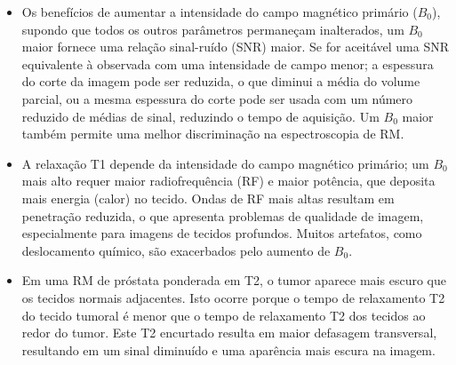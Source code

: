 \documentclass[11pt,a4paper]{article}
\newcounter{exemplo}
\begin{document}
\begin{exemplo}
\begin{itemize}
        \item Os benefícios de aumentar a intensidade do campo magnético primário ($B_0$), supondo que todos os outros parâmetros permaneçam inalterados, um $B_0$ maior fornece uma relação sinal-ruído (SNR) maior. Se for aceitável uma SNR equivalente à observada com uma intensidade de campo menor; a espessura do corte da imagem pode ser reduzida, o que diminui a média do volume parcial, ou a mesma espessura do corte pode ser usada com um número reduzido de médias de sinal, reduzindo o tempo de aquisição. Um $B_0$ maior também permite uma melhor discriminação na espectroscopia de RM.
        
        \item A relaxação T1 depende da intensidade do campo magnético primário; um $B_0$ mais alto requer maior radiofrequência (RF) e maior potência, que deposita mais energia (calor) no tecido. Ondas de RF mais altas resultam em penetração reduzida, o que apresenta problemas de qualidade de imagem, especialmente para imagens de tecidos profundos. Muitos artefatos, como deslocamento químico, são exacerbados pelo aumento de $B_0$.
                
        \item Em uma RM de próstata ponderada em T2, o tumor aparece mais escuro que os tecidos normais adjacentes. Isto ocorre porque o tempo de relaxamento T2 do tecido tumoral é menor que o tempo de relaxamento T2 dos tecidos ao redor do tumor. Este T2 encurtado resulta em maior defasagem transversal, resultando em um sinal diminuído e uma aparência mais escura na imagem. 
        
    \end{itemize}

\end{exemplo}


\end{document}

